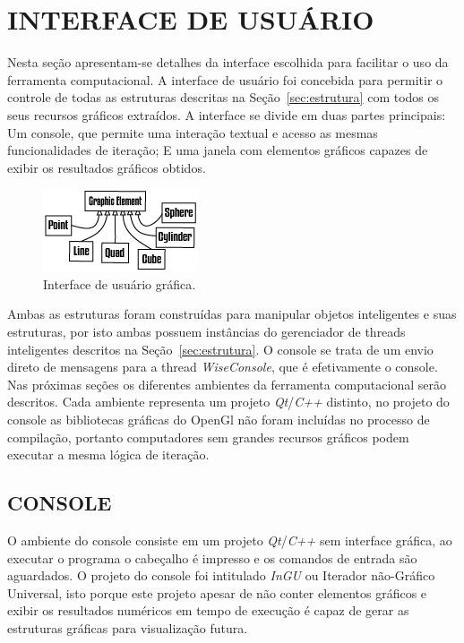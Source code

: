 \documentclass[
        english,			
        brazil			        %
        ,<...>]{abntbibufjf}
\begin{document}
\section{INTERFACE DE USUÁRIO}\label{sec:userinterface}

Nesta seção apresentam-se detalhes da interface escolhida para facilitar o uso da ferramenta computacional. A interface de usuário foi concebida para permitir o controle de todas as estruturas descritas na Seção~\ref{sec:estrutura} com todos os seus recursos gráficos extraídos. A interface se divide em duas partes principais: Um console, que permite uma interação textual e acesso as mesmas funcionalidades de iteração; E uma janela com elementos gráficos capazes de exibir os resultados gráficos obtidos. 

\begin{figure}[!htbp]
	\centering
	\includegraphics[scale=1]{Figures/GraphicElements}
	\caption{Interface de usuário gráfica.}
	\label{fig10:UI}
\end{figure}

Ambas as estruturas foram construídas para manipular objetos inteligentes e suas estruturas, por isto ambas possuem instâncias do gerenciador de threads inteligentes descritos na Seção~\ref{sec:estrutura}. O console se trata de um  envio direto de mensagens para a thread \textit{WiseConsole}, que é efetivamente o console. Nas próximas seções os diferentes ambientes da ferramenta computacional serão descritos. Cada ambiente representa um projeto \textit{Qt}/\textit{C++} distinto, no projeto do console as bibliotecas gráficas do OpenGl não foram incluídas no processo de compilação, portanto computadores sem grandes recursos gráficos podem executar a mesma lógica de iteração.

\subsection{CONSOLE}\label{sec:console}

O ambiente do console consiste em um projeto \textit{Qt}/\textit{C++} sem interface gráfica, ao executar o programa o cabeçalho é impresso e os comandos de entrada são aguardados. O projeto do console foi intitulado \textit{InGU} ou Iterador não-Gráfico Universal, isto porque este projeto apesar de não conter elementos gráficos e exibir os resultados numéricos em tempo de execução é capaz de gerar as estruturas gráficas para visualização futura.
\end{document}
